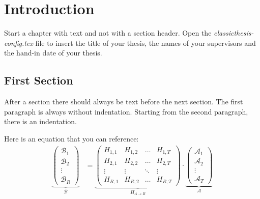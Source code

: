 \chapter{Introduction}\label{ch:introduction}

\glsresetall %



Start a chapter with text and not with a section header. Open the
\emph{classicthesis-config.tex} file to insert the title of your thesis, the
names of your supervisors and the hand-in date of your thesis.



\section{First Section}
\label{sec:first_section}

After a section there should always be text before the next section. The first
paragraph is always without indentation. Starting from the second paragraph,
there is an indentation.

Here is an equation that you can reference:
\begin{align}
\underbrace{\begin{pmatrix}\mathcal{B}_1\\\mathcal{B}_2\\\vdots\\\mathcal{B}_R\end{pmatrix}}_\mathcal{B} &= \underbrace{\begin{pmatrix}H_{1,1} & H_{1,2} & \hdots & H_{1,T}\\H_{2,1} & H_{2,2} & \hdots & H_{2,T}\\\vdots & \vdots & \ddots & \vdots\\H_{R,1} & H_{R,2} & \hdots & H_{R,T}\end{pmatrix}}_{H_{A\rightarrow B}}\cdot \underbrace{\begin{pmatrix}\mathcal{A}_1\\\mathcal{A}_2\\\vdots\\\mathcal{A}_T\end{pmatrix}}_\mathcal{A}\label{eqn:example}
\end{align}


